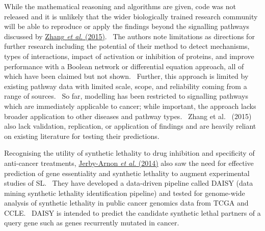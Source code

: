 While the mathematical reasoning and algorithms are given, code was not released and it is unlikely that the wider biologically trained research community will be able to reproduce or apply the findings beyond the signalling pathways discussed by \hyperlink{ENREF117}{Zhang}\hyperlink{ENREF117}{\textit{ et al.}}\hyperlink{ENREF117}{ (2015)}. \ The authors note limitations as directions for further research including the potential of their method to detect mechanisms, types of interactions, impact of activation or inhibition of proteins, and improve performance with a Boolean network or differential equation approach, all of which have been claimed but not shown. \ Further, this approach is limited by existing pathway data with limited scale, scope, and reliability coming from a range of sources. \ So far, modelling has been restricted to signalling pathways which are immediately applicable to cancer; while important, the approach lacks broader application to other diseases and pathway types. \ Zhang et al. \ (2015) also lack validation, replication, or application of findings and are heavily reliant on existing literature for testing their predictions. \  

Recognising the utility of synthetic lethality to drug inhibition and specificity of anti-cancer treatments, \hyperlink{ENREF53}{Jerby-Arnon}\hyperlink{ENREF53}{\textit{ et al.}}\hyperlink{ENREF53}{ (2014)} also saw the need for effective prediction of gene essentiality and synthetic lethality to augment experimental studies of SL. \ They have developed a data-driven pipeline called DAISY (data mining synthetic lethality identification pipeline) and tested for genome-wide analysis of synthetic lethality in public cancer genomics data from TCGA and CCLE. \ DAISY is intended to predict the candidate synthetic lethal partners of a query gene such as genes recurrently mutated in cancer. \  

